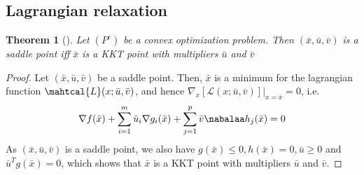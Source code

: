 \documentclass{book}
\theoremstyle{theoremv2}
\newtheorem{theorem}{Theorem}[chapter]
\theoremstyle{defv2}
\theoremstyle{remark}
\theoremstyle{remark}
\begin{document}
\subsection{Lagrangian relaxation}
\begin{theorem}[]
    Let $(P^c)$ be a convex optimization problem. Then $(\bar{x},\bar{u},\bar{v})$ is a saddle point iff $\bar{x}$ is a KKT point with multipliers $\bar{u}$ and $\bar{v}$
\end{theorem}
\begin{proof}
    Let $(\bar{x},\bar{u},\bar{v})$ be a saddle point. Then, $\bar{x}$ is a minimum for the lagrangian function $\mahtcal{L}(x;\bar{u},\bar{v})$, and hence $\nabla_x [\mathcal{L}(x;\bar{u},\bar{v})]|_{x=\bar{x}}=0$, i.e.
    \[
        \nabla f(\bar{x})  + \displaystyle\sum_{i=1}^{m}\bar{u}_i\nabla g_i(\bar{x}) + \displaystyle\sum_{j=1}^{p}\bar{v}\nabalaa h_j(\bar{x})=0
    \]
    As $(\bar{x},\bar{u},\bar{v})$ is a saddle point, we also have $g(\bar{x})\leq0, h(\bar{x})=0,\bar{u}\geq 0$ and $\bar{u}^T g(\bar{x})=0$, which shows that $\bar{x}$ is a KKT point with multipliers $\bar{u}$ and $\bar{v}$. 


\end{proof}
\end{document}
